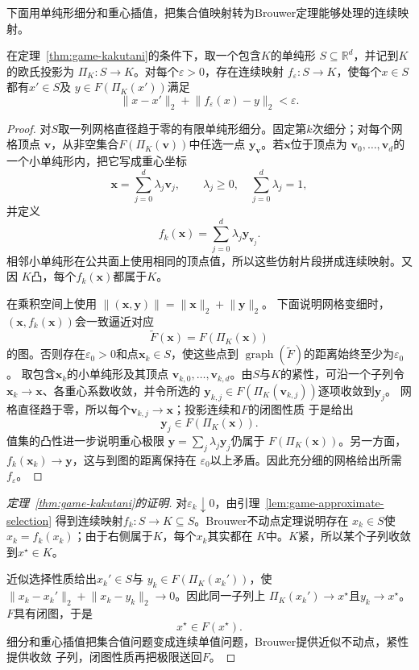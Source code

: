 下面用单纯形细分和重心插值，把集合值映射转为Brouwer定理能够处理的连续映射。

\begin{lemma}[单纯形上的连续近似选择]
\label{lem:game-approximate-selection}
在定理~\ref{thm:game-kakutani}的条件下，取一个包含\(K\)的单纯形
\(S\subseteq\mathbb{R}^d\)，并记到\(K\)的欧氏投影为
\(\Pi_K:S\to K\)。对每个\(\varepsilon>0\)，存在连续映射
\(f_\varepsilon:S\to K\)，使每个\(x\in S\)都有\(x'\in S\)及
\(y\in F(\Pi_K(x'))\)满足
\[
  \lVert x-x'\rVert_2
  +
  \lVert f_\varepsilon(x)-y\rVert_2
  <\varepsilon.
\]
\end{lemma}

\begin{proof}
对\(S\)取一列网格直径趋于零的有限单纯形细分。固定第\(k\)次细分；对每个网格顶点
\(\bm{v}\)，从非空集合\(F(\Pi_K(\bm{v}))\)中任选一点
\(\bm{y}_{\bm{v}}\)。若\(\bm{x}\)位于顶点为
\(\bm{v}_0,\ldots,\bm{v}_d\)的一个小单纯形内，把它写成重心坐标
\[
  \bm{x}
  =
  \sum_{j=0}^{d}\lambda_j\bm{v}_j,
  \qquad
  \lambda_j\geq0,\quad
  \sum_{j=0}^{d}\lambda_j=1,
\]
并定义
\[
  f_k(\bm{x})
  =
  \sum_{j=0}^{d}\lambda_j\bm{y}_{\bm{v}_j}.
\]
相邻小单纯形在公共面上使用相同的顶点值，所以这些仿射片段拼成连续映射。又因
\(K\)凸，每个\(f_k(\bm{x})\)都属于\(K\)。

在乘积空间上使用
\(\lVert(\bm{x},\bm{y})\rVert
=\lVert\bm{x}\rVert_2+\lVert\bm{y}\rVert_2\)。
下面说明网格变细时，\((\bm{x},f_k(\bm{x}))\)会一致逼近对应
\[
  \widetilde F(\bm{x})
  =
  F(\Pi_K(\bm{x}))
\]
的图。否则存在\(\varepsilon_0>0\)和点\(\bm{x}_k\in S\)，使这些点到
\(\operatorname{graph}(\widetilde F)\)的距离始终至少为\(\varepsilon_0\)。
取包含\(\bm{x}_k\)的小单纯形及其顶点
\(\bm{v}_{k,0},\ldots,\bm{v}_{k,d}\)。由\(S\)与\(K\)的紧性，可沿一个子列令
\(\bm{x}_k\to\bm{x}\)、各重心系数收敛，并令所选的
\(\bm{y}_{k,j}\in F(\Pi_K(\bm{v}_{k,j}))\)逐项收敛到\(\bm{y}_j\)。
网格直径趋于零，所以每个\(\bm{v}_{k,j}\to\bm{x}\)；投影连续和\(F\)的闭图性质
于是给出
\[
  \bm{y}_j\in F(\Pi_K(\bm{x})).
\]
值集的凸性进一步说明重心极限
\(\bm{y}=\sum_j\lambda_j\bm{y}_j\)仍属于
\(F(\Pi_K(\bm{x}))\)。另一方面，
\(f_k(\bm{x}_k)\to\bm{y}\)，这与到图的距离保持在
\(\varepsilon_0\)以上矛盾。因此充分细的网格给出所需
\(f_\varepsilon\)。
\end{proof}

\begin{proof}[定理~\ref{thm:game-kakutani}的证明]
对\(\varepsilon_k\downarrow0\)，由引理~\ref{lem:game-approximate-selection}
得到连续映射\(f_k:S\to K\subseteq S\)。Brouwer不动点定理说明存在
\(x_k\in S\)使\(x_k=f_k(x_k)\)；由于右侧属于\(K\)，每个\(x_k\)其实都在
\(K\)中。\(K\)紧，所以某个子列收敛到\(x^\star\in K\)。

近似选择性质给出\(x_k'\in S\)与
\(y_k\in F(\Pi_K(x_k'))\)，使
\(\lVert x_k-x_k'\rVert_2+\lVert x_k-y_k\rVert_2\to0\)。因此同一子列上
\(\Pi_K(x_k')\to x^\star\)且\(y_k\to x^\star\)。\(F\)具有闭图，于是
\[
  x^\star\in F(x^\star).
\]
细分和重心插值把集合值问题变成连续单值问题，Brouwer提供近似不动点，紧性提供收敛
子列，闭图性质再把极限送回\(F\)。
\end{proof}

